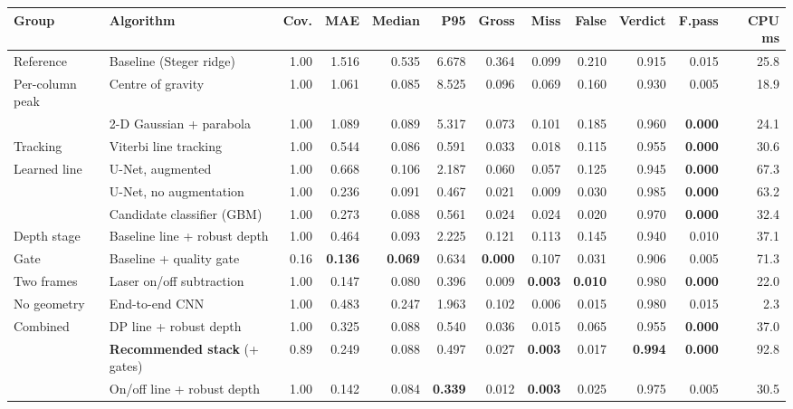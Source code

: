 \begin{tabular}{@{}llrrrrrrrrrr@{}}
\toprule
Group & Algorithm & Cov. & MAE & Median & P95 & Gross & Miss & False & Verdict & F.pass & CPU ms \\
\midrule
Reference & Baseline (Steger ridge) & 1.00 & 1.516 & 0.535 & 6.678 & 0.364 & 0.099 & 0.210 & 0.915 & 0.015 & 25.8 \\
\addlinespace[2pt]
Per-column peak & Centre of gravity & 1.00 & 1.061 & 0.085 & 8.525 & 0.096 & 0.069 & 0.160 & 0.930 & 0.005 & 18.9 \\
 & 2-D Gaussian + parabola & 1.00 & 1.089 & 0.089 & 5.317 & 0.073 & 0.101 & 0.185 & 0.960 & \textbf{0.000} & 24.1 \\
\addlinespace[2pt]
Tracking & Viterbi line tracking & 1.00 & 0.544 & 0.086 & 0.591 & 0.033 & 0.018 & 0.115 & 0.955 & \textbf{0.000} & 30.6 \\
\addlinespace[2pt]
Learned line & U-Net, augmented & 1.00 & 0.668 & 0.106 & 2.187 & 0.060 & 0.057 & 0.125 & 0.945 & \textbf{0.000} & 67.3 \\
 & U-Net, no augmentation & 1.00 & 0.236 & 0.091 & 0.467 & 0.021 & 0.009 & 0.030 & 0.985 & \textbf{0.000} & 63.2 \\
 & Candidate classifier (GBM) & 1.00 & 0.273 & 0.088 & 0.561 & 0.024 & 0.024 & 0.020 & 0.970 & \textbf{0.000} & 32.4 \\
\addlinespace[2pt]
Depth stage & Baseline line + robust depth & 1.00 & 0.464 & 0.093 & 2.225 & 0.121 & 0.113 & 0.145 & 0.940 & 0.010 & 37.1 \\
\addlinespace[2pt]
Gate & Baseline + quality gate & 0.16 & \textbf{0.136} & \textbf{0.069} & 0.634 & \textbf{0.000} & 0.107 & 0.031 & 0.906 & 0.005 & 71.3 \\
\addlinespace[2pt]
Two frames & Laser on/off subtraction & 1.00 & 0.147 & 0.080 & 0.396 & 0.009 & \textbf{0.003} & \textbf{0.010} & 0.980 & \textbf{0.000} & 22.0 \\
\addlinespace[2pt]
No geometry & End-to-end CNN & 1.00 & 0.483 & 0.247 & 1.963 & 0.102 & 0.006 & 0.015 & 0.980 & 0.015 & 2.3 \\
\addlinespace[2pt]
Combined & DP line + robust depth & 1.00 & 0.325 & 0.088 & 0.540 & 0.036 & 0.015 & 0.065 & 0.955 & \textbf{0.000} & 37.0 \\
 & \textbf{Recommended stack} (+ gates) & 0.89 & 0.249 & 0.088 & 0.497 & 0.027 & \textbf{0.003} & 0.017 & \textbf{0.994} & \textbf{0.000} & 92.8 \\
 & On/off line + robust depth & 1.00 & 0.142 & 0.084 & \textbf{0.339} & 0.012 & \textbf{0.003} & 0.025 & 0.975 & 0.005 & 30.5 \\
\bottomrule
\end{tabular}
